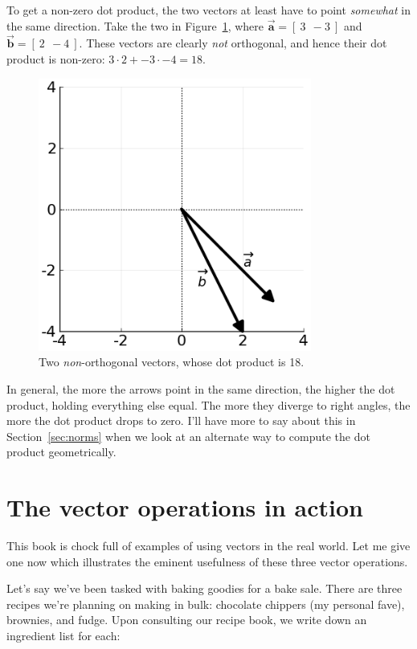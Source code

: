 To get a non-zero dot product, the two vectors at least have to point
\textit{somewhat} in the same direction. Take the two in
Figure~\ref{fig:dotProduct4}, where $\overrightarrow{\textbf{a}} = [\ 3\ \ -3\
]$ and $\overrightarrow{\textbf{b}} = [\ 2\ \ -4\ ]$. These vectors are clearly
\textit{not} orthogonal, and hence their dot product is non-zero: $3\cdot 2 +
-3\cdot -4 = 18$.

\begin{figure}[ht]
\centering
\includegraphics[width=0.80\textwidth]{dotProduct4.png}
\caption{Two \textit{non}-orthogonal vectors, whose dot product is 18.}
\label{fig:dotProduct4}
\end{figure}

In general, the more the arrows point in the same direction, the higher the dot
product, holding everything else equal. The more they diverge to right angles,
the more the dot product drops to zero. I'll have more to say about this in
Section~\ref{sec:norms} when we look at an alternate way to compute the dot
product geometrically.



\section{The vector operations in action}

This book is chock full of examples of using vectors in the real world. Let me
give one now which illustrates the eminent usefulness of these three vector
operations.

\smallskip
\label{bakeSale}
Let's say we've been tasked with baking goodies for a bake sale. There are
three recipes we're planning on making in bulk: chocolate chippers (my personal
fave), brownies, and fudge. Upon consulting our recipe book, we write down an
ingredient list for each:

